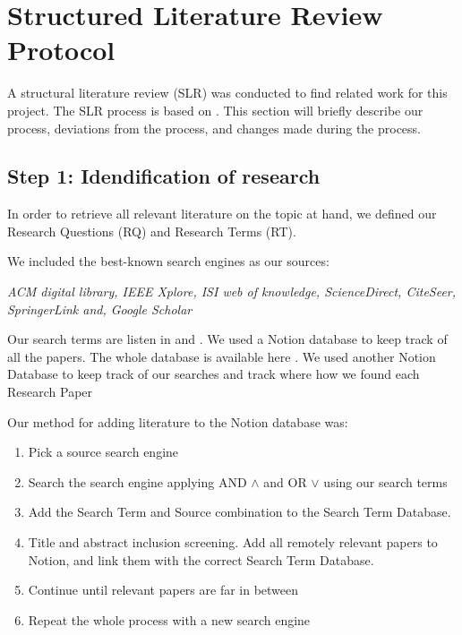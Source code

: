
\section{Structured Literature Review Protocol}
\label{section:BT:SLR}

A structural literature review (SLR) was conducted to find related work for this project.
The SLR process is based on \cite{AndersKofod-Petersen2018}.
This section will briefly describe our process, deviations from the process,
and changes made during the process.

\subsection{Step 1: Idendification of research}
In order to retrieve all relevant literature on the topic at hand, we defined our
Research Questions (RQ) and Research Terms (RT).

We included the best-known search engines as our sources:

\textit{
  ACM digital library,
  IEEE Xplore,
  ISI web of knowledge,
  ScienceDirect,
  CiteSeer,
  SpringerLink and,
  Google Scholar
}

Our search terms are listen in  and .
We used a Notion database to keep track of all the papers. The whole database is available here
\cite{slrdatabase}.
We used another Notion Database to keep track of our searches and track where how we found each Research Paper
\cite{searchtermtable}

Our method for adding literature to the Notion database was:
\begin{enumerate}
  \item Pick a source search engine
  \item Search the search engine applying AND $\wedge$ and OR $\vee$ using our search terms
  \item Add the Search Term and Source combination to the Search Term Database.
  \item Title and abstract inclusion screening. Add all remotely relevant papers to Notion, and link them with the correct Search Term Database.
  \item Continue until relevant papers are far in between
  \item Repeat the whole process with a new search engine
\end{enumerate}

